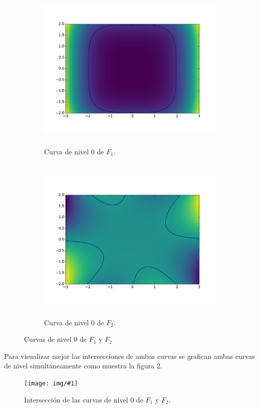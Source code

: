 \documentclass[a4paper, 11pt, spanish]{article}
\newcommand{\fig}[4]{%
	\begin{figure}[!ht]
		\centering
		\texttt{[image: img/\#1]}
		\caption{#4}
	\end{figure}
}
\begin{document}
\begin{figure}[!ht]
\centering
\begin{subfigure}{.5\textwidth}
  \centering
  \includegraphics[width=10cm, height=8cm]{img/curva0f1.pdf}
  \caption{Curva de nivel 0 de $F_{1}$.}
  \label{fig:sub1}
\end{subfigure}%
\begin{subfigure}{.5\textwidth}
  \centering
  \includegraphics[width=10cm, height=8cm]{img/curva0f2.pdf}
  \caption{Curva de nivel 0 de $F_{2}$.}
  \label{fig:sub2}
\end{subfigure}
\caption{Curvas de nivel 0 de $F_{1}$ y $F_{2}$}
\label{fig:test}
\end{figure}

Para visualizar mejor las intersecciones de ambas curvas se grafican ambas curvas de nivel simult\'aneamente como muestra la figura 2.

\fig{interseccioncurvas.pdf}{15cm}{10cm}{Intersecci\'on de las curvas de nivel 0 de $F_{1}$ y $F_{2}$.} \newpage
\end{document}

